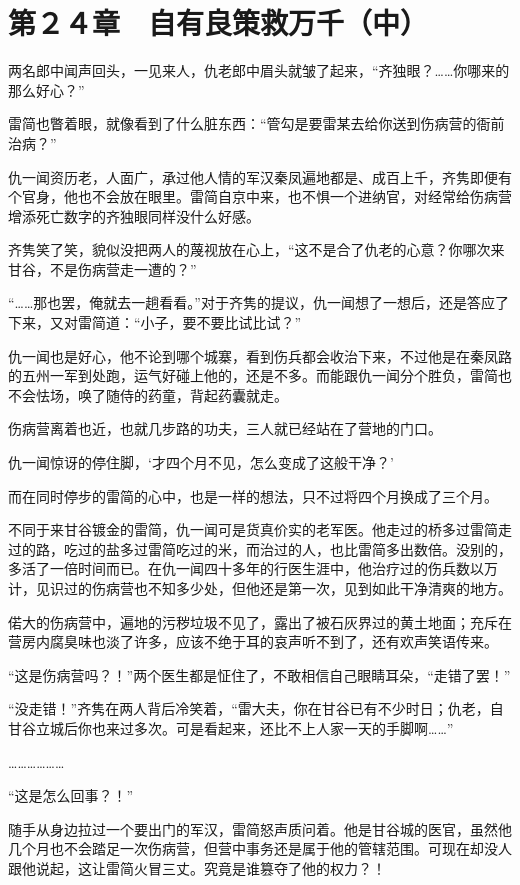 \section{第２４章　自有良策救万千（中）}

两名郎中闻声回头，一见来人，仇老郎中眉头就皱了起来，“齐独眼？……你哪来的那么好心？”

雷简也瞥着眼，就像看到了什么脏东西：“管勾是要雷某去给你送到伤病营的衙前治病？”

仇一闻资历老，人面广，承过他人情的军汉秦凤遍地都是、成百上千，齐隽即便有个官身，他也不会放在眼里。雷简自京中来，也不惧一个进纳官，对经常给伤病营增添死亡数字的齐独眼同样没什么好感。

齐隽笑了笑，貌似没把两人的蔑视放在心上，“这不是合了仇老的心意？你哪次来甘谷，不是伤病营走一遭的？”

“……那也罢，俺就去一趟看看。”对于齐隽的提议，仇一闻想了一想后，还是答应了下来，又对雷简道：“小子，要不要比试比试？”

仇一闻也是好心，他不论到哪个城寨，看到伤兵都会收治下来，不过他是在秦凤路的五州一军到处跑，运气好碰上他的，还是不多。而能跟仇一闻分个胜负，雷简也不会怯场，唤了随侍的药童，背起药囊就走。

伤病营离着也近，也就几步路的功夫，三人就已经站在了营地的门口。

仇一闻惊讶的停住脚，‘才四个月不见，怎么变成了这般干净？’

而在同时停步的雷简的心中，也是一样的想法，只不过将四个月换成了三个月。

不同于来甘谷镀金的雷简，仇一闻可是货真价实的老军医。他走过的桥多过雷简走过的路，吃过的盐多过雷简吃过的米，而治过的人，也比雷简多出数倍。没别的，多活了一倍时间而已。在仇一闻四十多年的行医生涯中，他治疗过的伤兵数以万计，见识过的伤病营也不知多少处，但他还是第一次，见到如此干净清爽的地方。

偌大的伤病营中，遍地的污秽垃圾不见了，露出了被石灰界过的黄土地面；充斥在营房内腐臭味也淡了许多，应该不绝于耳的哀声听不到了，还有欢声笑语传来。

“这是伤病营吗？！”两个医生都是怔住了，不敢相信自己眼睛耳朵，“走错了罢！”

“没走错！”齐隽在两人背后冷笑着，“雷大夫，你在甘谷已有不少时日；仇老，自甘谷立城后你也来过多次。可是看起来，还比不上人家一天的手脚啊……”

………………

“这是怎么回事？！”

随手从身边拉过一个要出门的军汉，雷简怒声质问着。他是甘谷城的医官，虽然他几个月也不会踏足一次伤病营，但营中事务还是属于他的管辖范围。可现在却没人跟他说起，这让雷简火冒三丈。究竟是谁篡夺了他的权力？！


